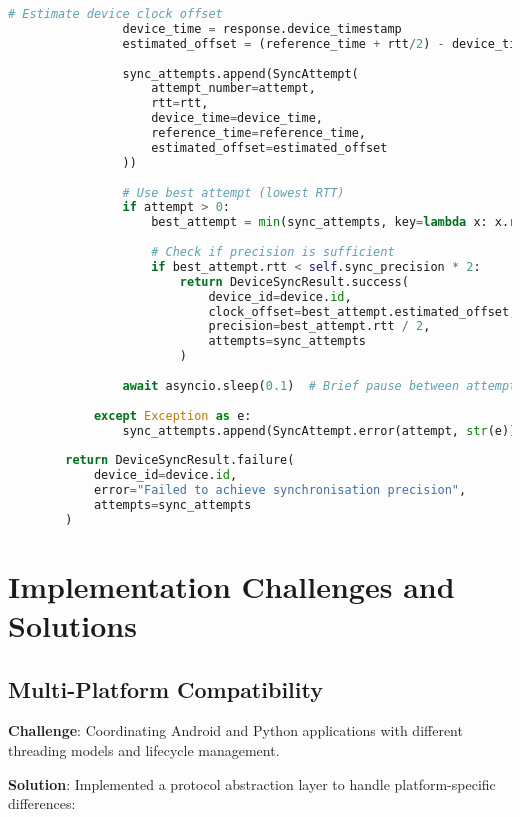 \documentclass[11pt,a4paper]{report}
\begin{document}
\begin{lstlisting}[language=Python]
                # Estimate device clock offset
                device_time = response.device_timestamp
                estimated_offset = (reference_time + rtt/2) - device_time
                
                sync_attempts.append(SyncAttempt(
                    attempt_number=attempt,
                    rtt=rtt,
                    device_time=device_time,
                    reference_time=reference_time,
                    estimated_offset=estimated_offset
                ))
                
                # Use best attempt (lowest RTT)
                if attempt > 0:
                    best_attempt = min(sync_attempts, key=lambda x: x.rtt)
                    
                    # Check if precision is sufficient
                    if best_attempt.rtt < self.sync_precision * 2:
                        return DeviceSyncResult.success(
                            device_id=device.id,
                            clock_offset=best_attempt.estimated_offset,
                            precision=best_attempt.rtt / 2,
                            attempts=sync_attempts
                        )
                
                await asyncio.sleep(0.1)  # Brief pause between attempts
                
            except Exception as e:
                sync_attempts.append(SyncAttempt.error(attempt, str(e)))
        
        return DeviceSyncResult.failure(
            device_id=device.id,
            error="Failed to achieve synchronisation precision",
            attempts=sync_attempts
        )
\end{lstlisting}

\section{Implementation Challenges and Solutions}

\subsection{Multi-Platform Compatibility}

\textbf{Challenge}: Coordinating Android and Python applications with different threading models and lifecycle management.

\textbf{Solution}: Implemented a protocol abstraction layer to handle platform-specific differences:
\end{document}

